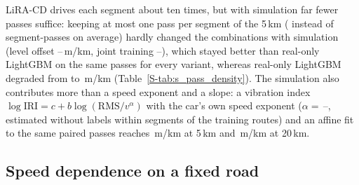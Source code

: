 LiRA-CD drives each segment about ten times, but with simulation far fewer passes suffice: keeping at most one pass per segment of the 5\,km (\pdUnitsOne{} instead of \kdUnitsFive{} segment-passes on average) hardly changed the combinations with simulation (level offset \pdCalOneMin--\pdCalOneMax\,m/km, joint training \pdPoolOneMin--\pdPoolOneMax), which stayed better than real-only LightGBM on the same passes \pdOneAllDraws{} for every variant, whereas real-only LightGBM degraded from \vbRealOnlyFive{} to \pdRealOne\,m/km (Table~\ref{S-tab:s_pass_density}).
The simulation also contributes more than a speed exponent and a slope: a vibration index $\log\mathrm{IRI}=c+b\log(\mathrm{RMS}/v^{\alpha})$ with the car's own speed exponent ($\alpha=$\,\nsAlphaCarMin--\nsAlphaCarMax, estimated without labels within segments of the training routes) and an affine fit to the same paired passes reaches \nsCarAffineFive\,m/km at 5\,km and \nsCarAffineTwenty\,m/km at 20\,km.

\subsection{Speed dependence on a fixed road}
\label{sec:res_speed}

